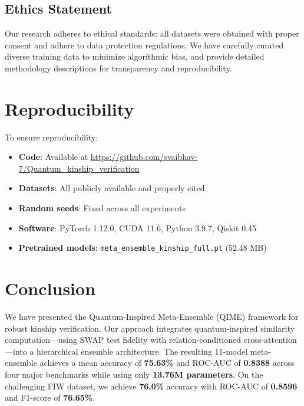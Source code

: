 \documentclass[journal,12pt]{IEEEtran}
\begin{document}
\subsection{Ethics Statement}
Our research adheres to ethical standards: all datasets were obtained with
proper consent and adhere to data protection regulations. We have
carefully curated diverse training data to minimize algorithmic bias, and
provide detailed methodology descriptions for transparency and
reproducibility.

\section{Reproducibility}
\label{sec:reproducibility}

To ensure reproducibility:
\begin{itemize}
    \item \textbf{Code}: Available at
          \url{https://github.com/svaibhav-7/Quantum_kinship_verification}
    \item \textbf{Datasets}: All publicly available and properly cited
    \item \textbf{Random seeds}: Fixed across all experiments
    \item \textbf{Software}: PyTorch 1.12.0, CUDA 11.6, Python 3.9.7,
          Qiskit 0.45
    \item \textbf{Pretrained models}:
          \texttt{meta\_ensemble\_kinship\_full.pt} (52.48 MB)
\end{itemize}

\section{Conclusion}
\label{sec:conclusion}

We have presented the Quantum-Inspired Meta-Ensemble (QIME) framework
for robust kinship verification. Our approach integrates quantum-inspired
similarity computation—using SWAP test fidelity with
relation-conditioned cross-attention—into a hierarchical ensemble
architecture. The resulting 11-model meta-ensemble achieves a mean
accuracy of \textbf{75.63\%} and ROC-AUC of \textbf{0.8388} across four
major benchmarks while using only \textbf{13.76M parameters}. On the
challenging FIW dataset, we achieve \textbf{76.0\%} accuracy with
ROC-AUC of \textbf{0.8596} and F1-score of \textbf{76.65\%}.
\end{document}
